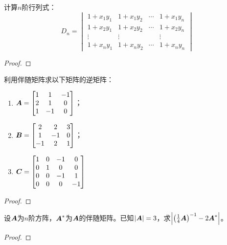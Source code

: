 \begin{problem}
计算\(n\)阶行列式：
\begin{equation*}
    D_n=
    \begin{vmatrix}
        1+x_{1}y_{1} & 1+x_{1}y_{2} & \cdots & 1+x_{1}y_{n} \\
        1+x_{2}y_{1} & 1+x_{2}y_{2} & \cdots & 1+x_{2}y_{n} \\
        \vdots       & \vdots       &        & \vdots       \\
        1+x_{n}y_{1} & 1+x_{n}y_{2} & \cdots & 1+x_{n}y_{n}
    \end{vmatrix}
\end{equation*}
\end{problem}
\begin{proof}

\end{proof}

\begin{problem}
利用伴随矩阵求以下矩阵的逆矩阵：
\begin{enumerate}
    \item \(\boldsymbol{A}=\begin{bmatrix}
              1 & 1  & -1 \\
              2 & 1  & 0  \\
              1 & -1 & 0
          \end{bmatrix}\)；
    \item \(\boldsymbol{B}=\begin{bmatrix}
              2  & 2  & 3 \\
              1  & -1 & 0 \\
              -1 & 2  & 1
          \end{bmatrix}\)；
    \item \(\boldsymbol{C}=\begin{bmatrix}
              1 & 0 & -1 & 0  \\
              0 & 1 & 0  & 0  \\
              0 & 0 & -1 & 1  \\
              0 & 0 & 0  & -1
          \end{bmatrix}\)
\end{enumerate}
\end{problem}
\begin{proof}
\end{proof}

\begin{problem}
设\(\boldsymbol{A}\)为\(n\)阶方阵，\(\boldsymbol{A}^*\)为\(\boldsymbol{A}\)的伴随矩阵。已知\(\left|\boldsymbol{A} \right|=3\)，求\(\left|{\left( \frac{1}{4}\boldsymbol{A} \right)}^{-1}-2\boldsymbol{A}^* \right|\)。
\end{problem}
\begin{proof}
\end{proof}

